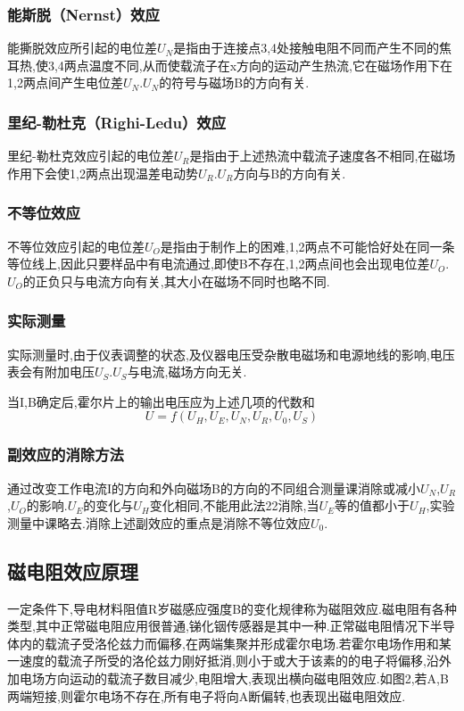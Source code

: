 \documentclass{thuemp}
\begin{document}
\subsubsection{能斯脱（Nernst）效应}
能撕脱效应所引起的电位差$U_{N}$是指由于连接点3,4处接触电阻不同而产生不同的焦耳热,使3,4两点温度不同,从而使载流子在x方向的运动产生热流,它在磁场作用下在1,2两点间产生电位差$U_{N}$.$U_{N}$的符号与磁场B的方向有关.
\subsubsection{里纪-勒杜克（Righi-Ledu）效应}
里纪-勒杜克效应引起的电位差$U_{R}$是指由于上述热流中载流子速度各不相同,在磁场作用下会使1,2两点出现温差电动势$U_{R}$.$U_{R}$方向与B的方向有关.
\subsubsection{不等位效应}
不等位效应引起的电位差$U_{O}$是指由于制作上的困难,1,2两点不可能恰好处在同一条等位线上,因此只要样品中有电流通过,即使B不存在,1,2两点间也会出现电位差$U_{O}$.$U_{O}$的正负只与电流方向有关,其大小在磁场不同时也略不同.
\subsubsection{实际测量}
实际测量时,由于仪表调整的状态,及仪器电压受杂散电磁场和电源地线的影响,电压表会有附加电压$U_{S}$.$U_{S}$与电流,磁场方向无关.


当I,B确定后,霍尔片上的输出电压应为上述几项的代数和
\[U=f(U_{H},U_{E},U_{N},U_{R},U_{0},U_{S})\]
\subsubsection{副效应的消除方法}
通过改变工作电流I的方向和外向磁场B的方向的不同组合测量课消除或减小$U_{N}$,$U_{R}$,$U_{O}$的影响.$U_{E}$的变化与$U_{H}$变化相同,不能用此法22消除,当$U_{E}$等的值都小于$U_{H}$,实验测量中课略去.消除上述副效应的重点是消除不等位效应$U_{0}$.
\subsection{磁电阻效应原理}
一定条件下,导电材料阻值R岁磁感应强度B的变化规律称为磁阻效应.磁电阻有各种类型,其中正常磁电阻应用很普通,锑化铟传感器是其中一种.正常磁电阻情况下半导体内的载流子受洛伦兹力而偏移,在两端集聚并形成霍尔电场.若霍尔电场作用和某一速度的载流子所受的洛伦兹力刚好抵消,则小于或大于该素的的电子将偏移,沿外加电场方向运动的载流子数目减少,电阻增大,表现出横向磁电阻效应.如图2,若A,B两端短接,则霍尔电场不存在,所有电子将向A断偏转,也表现出磁电阻效应.
\end{document}
